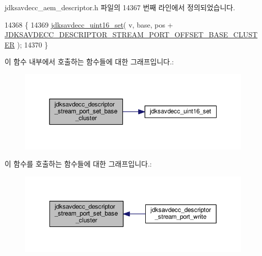 jdksavdecc\+\_\+aem\+\_\+descriptor.\+h 파일의 14367 번째 라인에서 정의되었습니다.


\begin{DoxyCode}
14368 \{
14369     \hyperlink{group__endian_ga14b9eeadc05f94334096c127c955a60b}{jdksavdecc\_uint16\_set}( v, base, pos + 
      \hyperlink{group__descriptor__stream__port_gab0727e3e5c98cc2806c8a22bace4e62a}{JDKSAVDECC\_DESCRIPTOR\_STREAM\_PORT\_OFFSET\_BASE\_CLUSTER} 
      );
14370 \}
\end{DoxyCode}


이 함수 내부에서 호출하는 함수들에 대한 그래프입니다.\+:
\nopagebreak
\begin{figure}[H]
\begin{center}
\leavevmode
\includegraphics[width=350pt]{group__descriptor__stream__port_gae89f646edcaebd56089db2efb1a051e1_cgraph}
\end{center}
\end{figure}




이 함수를 호출하는 함수들에 대한 그래프입니다.\+:
\nopagebreak
\begin{figure}[H]
\begin{center}
\leavevmode
\includegraphics[width=349pt]{group__descriptor__stream__port_gae89f646edcaebd56089db2efb1a051e1_icgraph}
\end{center}
\end{figure}


